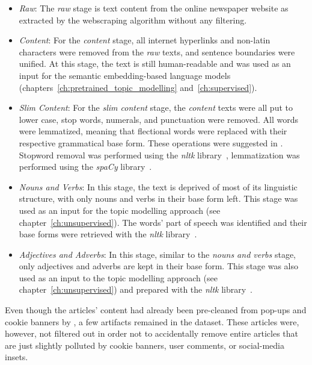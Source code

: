 \begin{itemize}
    \item \textit{Raw}: The \textit{raw} stage is text content from the online newspaper website as extracted by the webscraping algorithm without any filtering.
    \item \textit{Content}: For the \textit{content} stage, all internet hyperlinks and non-latin characters were removed from the \textit{raw} texts, and sentence boundaries were unified. At this stage, the text is still human-readable and was used as an input for the semantic embedding-based language models (chapters~\ref{ch:pretrained_topic_modelling} and~\ref{ch:supervised}).
    \item \textit{Slim Content}: For the \textit{slim content} stage, the \textit{content} texts were all put to lower case, stop words, numerals, and punctuation were removed. All words were lemmatized, meaning that flectional words were replaced with their respective grammatical base form. These operations were suggested in \textcite[p. 254]{vajjala_practical_2020}. Stopword removal was performed using the \textit{nltk} library~\autocite{bird_natural_2019}, lemmatization was performed using the \textit{spaCy} library~\autocite{spacy_spacy_nodate}.
    \item \textit{Nouns and Verbs}: In this stage, the text is deprived of most of its linguistic structure, with only nouns and verbs in their base form left. This stage was used as an input for the topic modelling approach (see chapter~\ref{ch:unsupervised}). The words' part of speech was identified and their base forms were retrieved with the \textit{nltk} library~\autocite{bird_natural_2019}.
    \item \textit{Adjectives and Adverbs}: In this stage, similar to the \textit{nouns and verbs} stage, only adjectives and adverbs are kept in their base form. This stage was also used as an input to the topic modelling approach (see chapter~\ref{ch:unsupervised}) and prepared with the \textit{nltk} library~\autocite{bird_natural_2019}.
\end{itemize}

Even though the articles' content had already been pre-cleaned from pop-ups and cookie banners by \textcite{fenske_using_2022}, a few artifacts remained in the dataset. These articles were, however, not filtered out in order not to accidentally remove entire articles that are just slightly polluted by cookie banners, user comments, or social-media insets.


